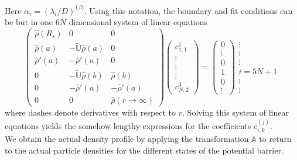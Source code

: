 Here $\alpha_i = (\lambda_i / D)^{1/2}$. Using this notation, the boundary and fit conditions can be but in one $6 N$ dimensional system of linear equations
\begin{equation}
    \left( \begin{array}{lll}
        \hat{\rho}(R_s) & 0 & 0 \\
        \hat{\rho}(a)   & -\tilde{\mathbb{U}}\hat{\rho}(a) & 0 \\
        \hat{\rho}'(a) & -\hat{\rho}'(a) & 0 \\
        0 &  -\tilde{\mathbb{U}}\hat{\rho}(b) & \hat{\rho}(b) \\
        0 &  -\hat{\rho}'(a) & - \hat{\rho}'(a) \\
        0 & 0 & \hat{\rho}(r\rightarrow \infty)
    \end{array}\right) \left( \begin{array}{c} c_{1,1}^{1} \\ \vdots \\ \vdots \\ \vdots \\ c_{N,2}^{3} \end{array} \right) = 
    \left( \begin{array}{c} 0 \\ \vdots \\ 0 \\ 1 \\ 0 \\ \vdots \end{array} \right) \begin{array}{c} \vdots \\ \vdots \\ \vdots \\ i = 5N+1 \\ \vdots \\ \vdots \end{array}
    \label{lgs}
\end{equation}
where dashes denote derivatives with respect to $r$. Solving this system of linear equations yields the somehow lengthy expressions for the coefficients $c_{i,k}^{(j)}$. \\ We obtain the actual density profile by applying the transformation $\mathbb{A}$ to return to the actual particle densities for the different states of the potential barrier.
